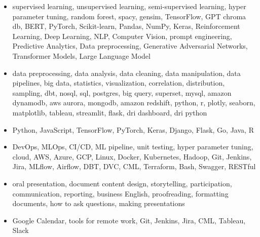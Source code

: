 \documentclass{minimal}
\begin{document}
\begin{adjustwidth}{2em}{0em}
\begin{itemize}
    \item supervised learning, unsupervised learning, semi{-}supervised learning, hyper parameter tuning, random forest, spacy, gensim, TensorFlow, GPT chroma db, BERT, PyTorch, Scikit{-}learn, Pandas, NumPy, Keras, Reinforcement Learning, Deep Learning, NLP, Computer Vision, prompt engineering, Predictive Analytics, Data preprocessing, Generative Adversarial Networks, Transformer Models, Large Language Model
\end{itemize}
\begin{itemize}
    \item data preprocessing, data analysis, data cleaning, data manipulation, data pipelines, big data, statistics, visualization, correlation, distribution, sampling, dbt, nosql, sql, postgres, big query, superset, mysql, amazon dynamodb, aws aurora, mongodb, amazon redshift, python, r, plotly, seaborn, matplotlib, tableau, streamlit, flask, dri dashboard, dri python
\end{itemize}
\begin{itemize}
    \item Python, JavaScript, TensorFlow, PyTorch, Keras, Django, Flask, Go, Java, R
\end{itemize}
\begin{itemize}
    \item DevOps, MLOps, CI/CD, ML pipeline, unit testing, hyper parameter tuning, cloud, AWS, Azure, GCP, Linux, Docker, Kubernetes, Hadoop, Git, Jenkins, Jira, MLflow, Airflow, DBT, DVC, CML, Terraform, Bash, Swagger, RESTful
\end{itemize}
\begin{itemize}
    \item oral presentation, document content design, storytelling, participation, communication, reporting, business English, proofreading, formatting documents, how to ask questions, making presentations
\end{itemize}
\begin{itemize}
    \item Google Calendar, tools for remote work, Git, Jenkins, Jira, CML, Tableau, Slack
\end{itemize}
\end{adjustwidth}
\vspace{1em}

\vspace{1em}






\begin{multicols}{2}
        \columnbreak
        
\end{multicols}
\end{document}
